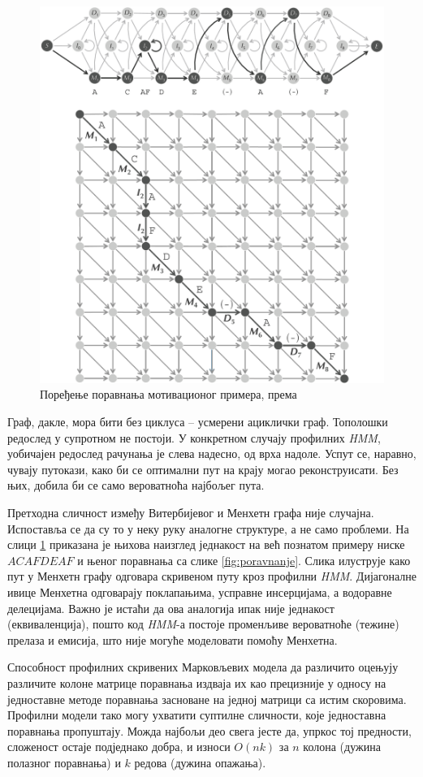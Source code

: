 \documentclass[12pt,oneside]{memoir}
\begin{document}
\begin{CJK}{UTF8}{ipxm}
\begin{figure}[H]
  \centering
  \includegraphics[width=.85\textwidth]{poravnanje2.png}
  \caption{Поређење поравнања мотивационог примера, према \cite{compeau2015}}
  \label{fig:poravnanje2}
\end{figure}

Граф, дакле, мора бити без циклуса -- усмерени ациклички граф. Тополошки редослед у супротном не постоји. У конкретном случају профилних \textit{HMM}, уобичајен редослед рачунања је слева надесно, од врха надоле. Успут се, наравно, чувају путокази, како би се оптимални пут на крају могао реконструисати. Без њих, добила би се само вероватноћа најбољег пута.

Претходна сличност између Витербијевог и Менхетн графа није случајна. Испоставља се да су то у неку руку аналогне структуре, а не само проблеми. На слици \ref{fig:poravnanje2} приказана је њихова наизглед једнакост на већ познатом примеру ниске $ACAFDEAF$ и њеног поравнања са слике \ref{fig:poravnanje}. Слика илуструје како пут у Менхетн графу одговара скривеном путу кроз профилни \textit{HMM}. Дијагоналне ивице Менхетна одговарају поклапањима, усправне инсерцијама, а водоравне делецијама. Важно је истаћи да ова аналогија ипак није једнакост (еквиваленција), пошто код \textit{HMM}-а постоје променљиве вероватноће (тежине) прелаза и емисија, што није могуће моделовати помоћу Менхетна.

Способност профилних скривених Марковљевих модела да различито оцењују различите колоне матрице поравнања издваја их као прецизније у односу на једноставне методе поравнања засноване на једној матрици са истим скоровима. Профилни модели тако могу ухватити суптилне сличности, које једноставна поравнања пропуштају. Можда најбољи део свега јесте да, упркос тој предности, сложеност остаје подједнако добра, и износи $O(nk)$ за $n$ колона (дужина полазног поравнања) и $k$ редова (дужина опажања).


\end{CJK}
\end{document}
